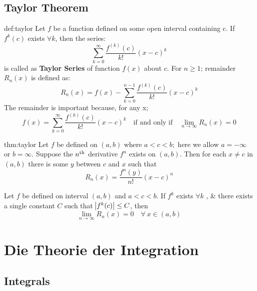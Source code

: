 \documentclass{notes}
\begin{document}
\section{Taylor Theorem}
\begin{definition}{def:taylor}
Let $f$ be a function defined on some open interval containing c. If $f^k (c)$
exists $\forall k$, then the series:
$$   \sum_{k=0}^{\infty} \frac{f^{(k)} (c)}{k!} (x -c)^k        $$
is called as \textbf{Taylor Series} of function $f(x)$ about c. For $n \geq 1$; remainder $R_n (x)$ is defined as:
$$R_n (x) = f(x) - \sum_{k=0}^{n-1} \frac{f^{(k)} (c)}{k!} (x -c)^k  $$
The remainder is important because, for any x;
$$  f(x) =   \sum_{k=0}^{\infty} \frac{f^{(k)} (c)}{k!} (x -c)^k \quad \text{if and only if}\quad \lim\limits_{n \to \infty} R_n(x) = 0 $$
\end{definition}
\begin{theorem}{thm:taylor}
Let $f$ be defined on $(a, b)$ where $a < c < b;$ here we allow $a = - \infty$
or $b = \infty$. Suppose the $n\textsuperscript{th}$ derivative $f ^{n}$ exists on $(a, b)$. Then for
each $x \not = c$ in $(a, b)$ there is some $y$ between $c$ and $x$ such that
$$ R_n (x) = \frac{f^n (y)}{n!}(x-c)^n$$
\end{theorem}
\begin{corollary}{}
	Let $f$ be defined on interval $(a,b)$ and $a<c<b$. If $f^k$ exists $ \forall k$ , \& there exists a single constant $C$ such that $\abs{f^k (c)} \leq C$, then 
	$$ \lim_{n \to \infty} R_n (x) = 0 \quad \forall\ x \in (a,b) $$
\end{corollary}

\chapter{Die Theorie der Integration}
\section{Integrals}
\end{document}
